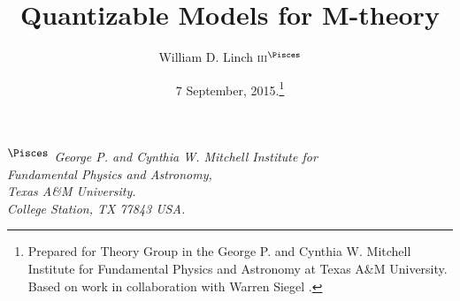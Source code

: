 \documentclass[12pt]{article} %
\title{
Quantizable Models for M-theory
}
\author{William D. Linch \textsc{iii}$^\text{\Pisces}$
}
\date{7 September, 2015.\footnote{Prepared for 
Theory Group in the 
George P. and Cynthia W. Mitchell Institute for Fundamental Physics and Astronomy at 
Texas A\&{}M University.
Based on work in collaboration with Warren Siegel \cite{Linch:2015lwa,Linch:2015fya,Linch:2015qva,Linch:2015fca}.
}
} %
\numberwithin{equation}{section}
\begin{document}
\maketitle


\begin{center}
{\em
${}^{\small \mbox\Pisces}$
George P. and Cynthia W. Mitchell Institute for\\
Fundamental Physics and Astronomy, \\
Texas A\&{}M University.\\
College Station, TX 77843 USA.
}\\
\end{center} 

\end{document}
